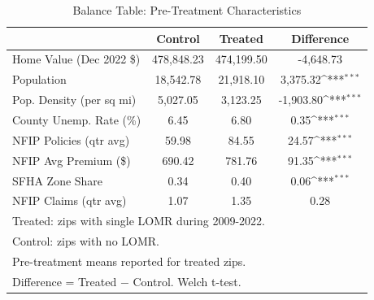 \begin{table}[htbp]\centering
\def\sym#1{\ifmmode^{#1}\else\(^{#1}\)\fi}
\caption{Balance Table: Pre-Treatment Characteristics}
\label{tab:balance}
\begin{tabular}{l*{1}{ccc}}
\hline\hline
                    &     Control&     Treated&  Difference         \\
\hline
Home Value (Dec 2022 \$)&  478,848.23&  474,199.50&   -4,648.73         \\
Population          &   18,542.78&   21,918.10&    3,375.32\sym{***}\\
Pop. Density (per sq mi)&    5,027.05&    3,123.25&   -1,903.80\sym{***}\\
County Unemp. Rate (\%)&        6.45&        6.80&        0.35\sym{***}\\
NFIP Policies (qtr avg)&       59.98&       84.55&       24.57\sym{***}\\
NFIP Avg Premium (\$)&      690.42&      781.76&       91.35\sym{***}\\
SFHA Zone Share     &        0.34&        0.40&        0.06\sym{***}\\
NFIP Claims (qtr avg)&        1.07&        1.35&        0.28         \\
\hline\hline
\multicolumn{4}{l}{\footnotesize Treated: zips with single LOMR during 2009-2022.}\\
\multicolumn{4}{l}{\footnotesize Control: zips with no LOMR.}\\
\multicolumn{4}{l}{\footnotesize Pre-treatment means reported for treated zips.}\\
\multicolumn{4}{l}{\footnotesize Difference = Treated $-$ Control. Welch t-test.}\\
\end{tabular}
\end{table}
